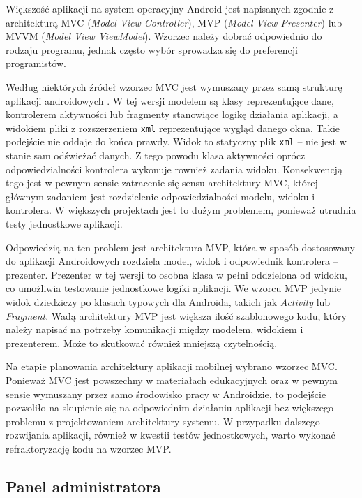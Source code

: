 \documentclass[a4paper,twoside,12pt]{book}
\newcommand{\obcy}[1]{\emph{#1}}
\newcommand{\english}[1]{{\selectlanguage{british}\obcy{#1}}}
\begin{document}
Większość aplikacji na system operacyjny Android jest napisanych zgodnie z architekturą MVC (\english{Model View Controller}), MVP (\english{Model View Presenter}) lub MVVM (\english{Model View ViewModel}). Wzorzec należy dobrać odpowiednio do rodzaju programu, jednak często wybór sprowadza się do preferencji programistów. 

Według niektórych źródeł wzorzec MVC jest wymuszany przez samą strukturę aplikacji androidowych \cite{bib:internetMVC}. W tej wersji modelem są klasy reprezentujące dane, kontrolerem aktywności lub fragmenty stanowiące logikę działania aplikacji, a widokiem pliki z rozszerzeniem \texttt{xml} reprezentujące wygląd danego okna. Takie podejście nie oddaje do końca prawdy. Widok to statyczny plik \texttt{xml} -- nie jest w stanie sam odświeżać danych. Z tego powodu klasa aktywności oprócz odpowiedzialności kontrolera wykonuje rownież zadania widoku. Konsekwencją tego jest w pewnym sensie zatracenie się sensu architektury MVC, której głównym zadaniem jest rozdzielenie odpowiedzialności modelu, widoku i kontrolera. W większych projektach jest to dużym problemem, ponieważ utrudnia testy jednostkowe aplikacji.

Odpowiedzią na ten problem jest architektura MVP, która w sposób dostosowany do aplikacji Androidowych rozdziela model, widok i odpowiednik kontrolera -- prezenter. Prezenter w tej wersji to osobna klasa w pełni oddzielona od widoku, co umożliwia testowanie jednostkowe logiki aplikacji. We wzorcu MVP jedynie widok dziedziczy po klasach typowych dla Androida, takich jak \english{Activity} lub \english{Fragment}. Wadą architektury MVP jest większa ilość szablonowego kodu, który należy napisać na potrzeby komunikacji między modelem, widokiem i prezenterem. Może to skutkować również mniejszą czytelnością.

Na etapie planowania architektury aplikacji mobilnej wybrano wzorzec MVC. Ponieważ MVC jest powszechny w materiałach edukacyjnych oraz w pewnym sensie wymuszany przez samo środowisko pracy w Androidzie, to podejście pozwoliło na skupienie się na odpowiednim działaniu aplikacji bez większego problemu z projektowaniem architektury systemu. W przypadku dalszego rozwijania aplikacji, również w kwestii testów jednostkowych, warto wykonać refraktoryzację kodu na wzorzec MVP. 

\subsection{Panel administratora}
\end{document}
